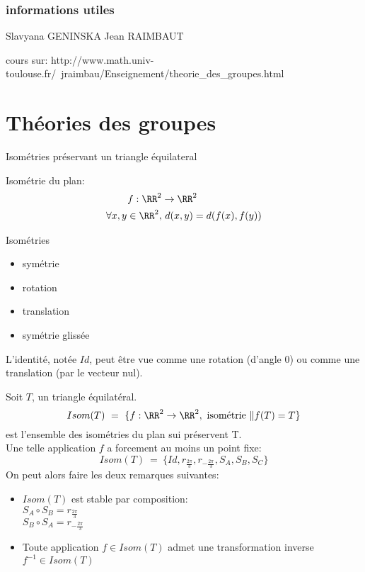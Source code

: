 \documentclass[../main.tex]{subfile}
\begin{document}
\section{informations utiles}
Slavyana GENINSKA
Jean RAIMBAUT

cours sur:
http://www.math.univ-toulouse.fr/~jraimbau/Enseignement/theorie\_des\_groupes.html
\part{Théories des groupes}

\begin{ex}
	Isométries préservant un triangle équilateral

\begin{rap}
	Isométrie du plan:
	$$
\begin{aligned}
	f: \RR^2 &\to \RR^2\\
	\forall x, y \in \RR^2, &\ d(x, y) = d(f(x), f(y))
\end{aligned}
	$$
\begin{ex}{Isométries}
\begin{itemize}
	\item symétrie
	\item rotation
	\item translation
	\item symétrie glissée
\end{itemize}
\end{ex}
\end{rap}

\begin{rema}
	L'identité, notée $Id$, peut être vue comme une rotation (d'angle 0) ou comme une translation (par le vecteur nul). 
\end{rema}

Soit $T$, un triangle équilatéral.\\
$$Isom(T) \ = \ \{f:\RR^2 \to \RR^2, \ \text{isométrie} \ \| f(T) = T\}$$
est l'ensemble des isométries du plan sui préservent T.\\
Une telle application $f$ a forcement au moins un point fixe:
$$Isom(T) \ = \ \{Id, r_{\frac{2\pi}{3}}, r_{-\frac{2\pi}{3}}, S_A, S_B, S_C\}$$
On peut alors faire les deux remarques suivantes:
\begin{rema}
\begin{itemize}	
	\item $Isom(T)$ est stable par composition:\\
	$S_A \circ S_B = r_{\frac{2\pi}{3}}$\\
	$S_B \circ S_A = r_{-\frac{2\pi}{3}}$
	\item Toute application $f \in Isom(T)$ admet une transformation inverse $f^{-1} \in Isom(T)$
\end{itemize}
\end{rema}
\end{ex}
\end{document}

